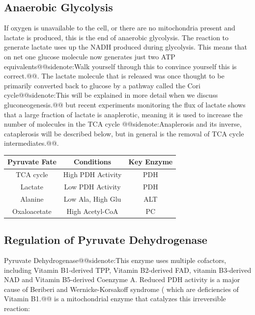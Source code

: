 \documentclass{tufte-handout}
\makeatletter
\def\sidenote#1{@@sidenote:#1@@}
\makeatother
\begin{document}
\subsection{Anaerobic Glycolysis}
If oxygen is unavailable to the cell, or there are no mitochondria present and lactate is produced, this is the end of anaerobic glycolysis.  The reaction to generate lactate uses up the NADH produced during glycolysis.  This means that on net one glucose molecule now generates just two ATP equivalents\sidenote{Walk yourself through this to convince yourself this is correct.}.  The lactate molecule that is released was once thought to be primarily converted back to glucose by a pathway called the Cori cycle\sidenote{This will be explained in more detail when we discuss gluconeogenesis.} but recent experiments monitoring the flux of lactate shows that a large fraction of lactate is anaplerotic, meaning it is used to increase the number of molecules in the TCA cycle \citep{Hui2017,Ferguson2018}\sidenote{Anaplerosis and its inverse, cataplerosis will be described below, but in general is the removal of TCA cycle intermediates.}.

\begin{margintable}
\centering
\caption{Potential fates of Pyruvate.}
\label{tab:pyruvate-fates-tca}
\begin{tabular}{ccc}
\hline
\textbf {Pyruvate Fate} & \textbf{Conditions}  & \textbf{Key Enzyme} \\
\hline
TCA cycle & High PDH Activity & PDH \\
Lactate & Low PDH Activity & PDH \\
Alanine & Low Ala, High Glu & ALT\\
Oxaloacetate & High Acetyl-CoA & PC\nomenclature{PC}{Pyruvate Carboxylase} \\
\hline
\end{tabular}
\end{margintable}


\subsection{Regulation of Pyruvate Dehydrogenase}

Pyruvate Dehydrogenase\sidenote{This enzyme uses multiple cofactors, including Vitamin B1-derived TPP, Vitamin B2-derived FAD, vitamin B3-derived NAD and Vitamin B5-derived Coenzyme A.\index{Vitamins!B Vitamins}  Reduced PDH activity is a major cause of Beriberi and Wernicke-Korsakoff syndrome ( which are deficiencies of Vitamin B1.} is a mitochondrial enzyme that catalyzes this irreversible reaction:
\end{document}
